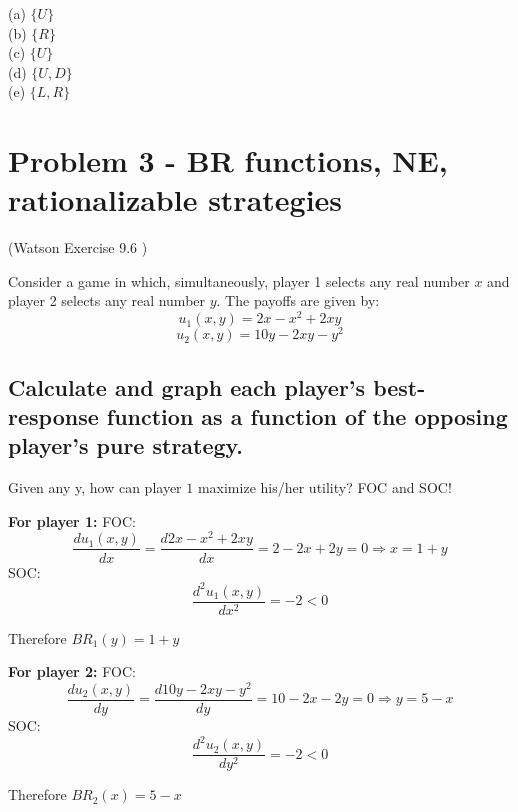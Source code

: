 \documentclass{article}
\begin{document}
(a) $\{U\}$ \\ \indent (b) $\{R\}$ \\ \indent (c) $\{U\}$ \\ \indent (d) $\{U,D\}$ \\ \indent (e) $\{L,R\}$

\bigskip

\section{Problem 3 - BR functions, NE, rationalizable strategies}

(Watson Exercise 9.6 )

Consider a game in which, simultaneously, player 1 selects any real number
$x$ and player 2 selects any real number $y$. The payoffs are given by:
$$u_1(x,y)= 2x-x^2+2xy$$
$$u_2(x,y)= 10y-2xy -y^2$$

\subsection{Calculate and graph each player's best-response function as a function
of the opposing player’s pure strategy.}

\begin{mdframed}[backgroundcolor=blue!20,linecolor=white]
Given any y, how can player $1$ maximize his/her utility? FOC and SOC!
\end{mdframed}

\textbf{For player 1:}
\medskip
FOC:
$$\frac{d u_1(x,y)}{d x} = \frac{d 2x-x^2+2xy}{d x} = 2 - 2x +2y =0 \Rightarrow x = 1+y$$
SOC: 
$$\frac{d^2 u_1(x,y)}{d x^2} = -2<0$$

Therefore  $BR_1(y) = 1+y$

\medskip

\textbf{For player 2:}
\medskip
FOC:
$$\frac{d u_2(x,y)}{d y} = \frac{d  10y-2xy -y^2}{d y} = 10-2x-2y =0 \Rightarrow y = 5-x$$
SOC: 
$$\frac{d^2 u_2(x,y)}{d y^2} = -2<0$$

Therefore  $BR_2(x) = 5-x$

\begin{center}
\label{fig:br}
\end{center}
\vspace{2mm}
\end{document}
